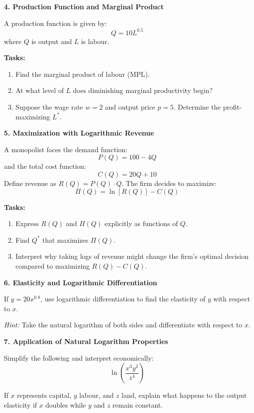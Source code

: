 \documentclass[12pt]{article}
\begin{document}
\vspace{1em}

\textbf{4. Production Function and Marginal Product}

A production function is given by:
\[
Q = 10L^{0.5}
\]
where \( Q \) is output and \( L \) is labour.

\textbf{Tasks:}
\begin{enumerate}
  \item Find the marginal product of labour (MPL).
  \item At what level of \( L \) does diminishing marginal productivity begin?
  \item Suppose the wage rate \( w = 2 \) and output price \( p = 5 \). Determine the profit-maximizing \( L^* \).
\end{enumerate}

\vspace{1em}

\textbf{5. Maximization with Logarithmic Revenue}

A monopolist faces the demand function:
\[
P(Q) = 100 - 4Q
\]
and the total cost function:
\[
C(Q) = 20Q + 10
\]
Define revenue as \( R(Q) = P(Q) \cdot Q \). The firm decides to maximize:
\[
\Pi(Q) = \ln[R(Q)] - C(Q)
\]

\textbf{Tasks:}
\begin{enumerate}
  \item Express \( R(Q) \) and \( \Pi(Q) \) explicitly as functions of \( Q \).
  \item Find \( Q^* \) that maximizes \( \Pi(Q) \).
  \item Interpret why taking logs of revenue might change the firm's optimal decision compared to maximizing \( R(Q) - C(Q) \).
\end{enumerate}

\vspace{1em}

\textbf{6. Elasticity and Logarithmic Differentiation}

If \( y = 20x^{0.8} \), use logarithmic differentiation to find the elasticity of \( y \) with respect to \( x \).

\textit{Hint:} Take the natural logarithm of both sides and differentiate with respect to \( x \).

\vspace{1em}

\textbf{7. Application of Natural Logarithm Properties}

Simplify the following and interpret economically:
\[
\ln \left( \frac{x^3 y^2}{z^4} \right)
\]

If \( x \) represents capital, \( y \) labour, and \( z \) land, explain what happens to the output elasticity if \( x \) doubles while \( y \) and \( z \) remain constant.

\vspace{1em}
\end{document}
